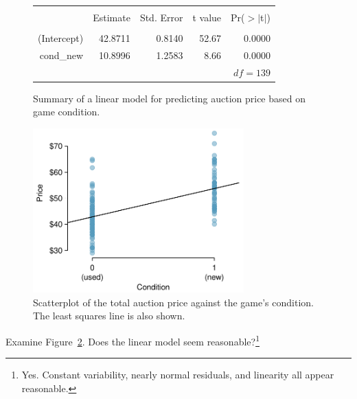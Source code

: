 \begin{figure}[ht]
\centering
\begin{tabular}{rrrrr}
  \hline
  \vspace{-3.7mm} & & & & \\
 & Estimate & Std. Error & t value & Pr($>$$|$t$|$) \\ 
  \hline
  \vspace{-3.8mm} & & & & \\
(Intercept) & 42.8711 & 0.8140 & 52.67 & 0.0000 \\ 
  cond\_\hspace{0.3mm}new & 10.8996 & 1.2583 & 8.66 & 0.0000 \\ 
   \hline
   &&&\multicolumn{2}{r}{$df=139$}
\end{tabular}
\caption{Summary of a linear model for predicting auction price based on game condition.}
\label{singleVarModelsForPriceUsingCond}
\end{figure}

\begin{figure}
\centering
\includegraphics[width=0.725\textwidth]{ch_regr_mult_and_log/figures/marioKartSingle/marioKartSingle}
\caption{Scatterplot of the total auction price against the game's condition. The least squares line is also shown.}
\label{marioKartSingle}
\end{figure}

\begin{exercise}
Examine Figure~\ref{marioKartSingle}. Does the linear model seem reasonable?\footnote{Yes. Constant variability, nearly normal residuals, and linearity all appear reasonable.}
\end{exercise}

